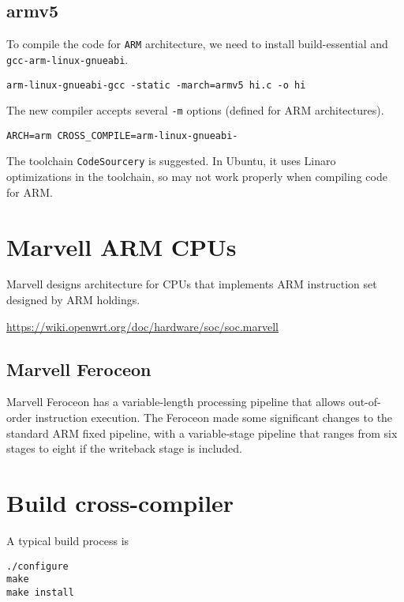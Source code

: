 \subsection{armv5}
\label{sec:armv5}

To compile the code for \verb!ARM! architecture, we need to install
build-essential and \verb!gcc-arm-linux-gnueabi!.

\begin{verbatim}
arm-linux-gnueabi-gcc -static -march=armv5 hi.c -o hi
\end{verbatim}

The new compiler accepts several \verb!-m! options (defined for ARM
architectures).
\begin{verbatim}
ARCH=arm CROSS_COMPILE=arm-linux-gnueabi-
\end{verbatim}

The toolchain \verb!CodeSourcery! is suggested. In Ubuntu, it uses Linaro
optimizations in the toolchain, so may not work properly when compiling code for
ARM.

\section{Marvell ARM CPUs}
\label{sec:Marvell}

Marvell designs architecture for CPUs that implements ARM instruction set
designed by ARM holdings.

\url{https://wiki.openwrt.org/doc/hardware/soc/soc.marvell}

\subsection{Marvell Feroceon}
\label{sec:Marvell-Feroceon-}

Marvell Feroceon has a variable-length processing pipeline that allows
out-of-order instruction execution. The Feroceon made some significant changes
to the standard ARM fixed pipeline, with a variable-stage pipeline that ranges
from six stages to eight if the writeback stage is included.



\section{Build cross-compiler}
\label{sec:cross_compiler_build}

A typical build process is 
\begin{verbatim}
./configure
make
make install
\end{verbatim}

